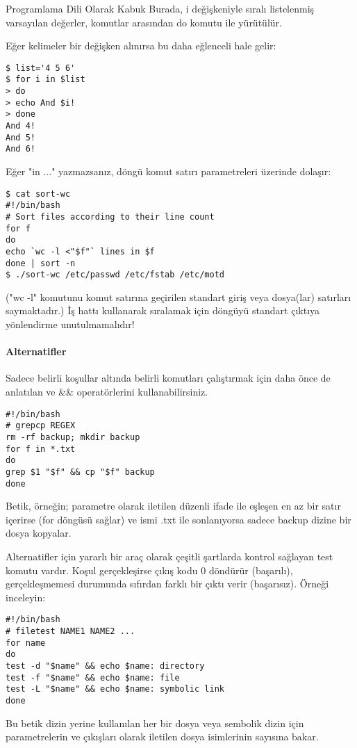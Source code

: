 \begin{section}{Programlama Dili Olarak Kabuk}
Burada, i değişkeniyle sıralı listelenmiş varsayılan değerler, komutlar arasından do komutu ile yürütülür.

Eğer kelimeler bir değişken alınırsa bu daha eğlenceli hale gelir:
\begin{verbatim}
$ list='4 5 6'
$ for i in $list
> do
> echo And $i!
> done
And 4!
And 5!
And 6!
\end{verbatim}

Eğer "in ..." yazmazsanız, döngü komut satırı parametreleri üzerinde dolaşır:
\begin{verbatim}
$ cat sort-wc
#!/bin/bash
# Sort files according to their line count
for f
do
echo `wc -l <"$f"` lines in $f
done | sort -n
$ ./sort-wc /etc/passwd /etc/fstab /etc/motd
\end{verbatim}

("wc -l" komutunu komut satırına geçirilen standart giriş veya dosya(lar) satırları saymaktadır.) İş hattı kullanarak sıralamak için döngüyü standart çıktıya yönlendirme unutulmamalıdır!

\paragraph{Alternatifler}{ Sadece belirli koşullar altında belirli komutları çalıştırmak için daha önce de anlatılan \textbar \textbar ve \&\& operatörlerini kullanabilirsiniz.
\begin{verbatim}
#!/bin/bash
# grepcp REGEX
rm -rf backup; mkdir backup
for f in *.txt
do
grep $1 "$f" && cp "$f" backup
done
\end{verbatim}
}

Betik, örneğin; parametre olarak iletilen düzenli ifade ile eşleşen en az bir satır içerirse (for döngüsü sağlar) ve ismi .txt ile sonlanıyorsa sadece backup
dizine bir dosya kopyalar.

Alternatifler için yararlı bir araç olarak çeşitli şartlarda kontrol sağlayan test komutu vardır. Koşul gerçekleşirse çıkış kodu 0 döndürür (başarılı),
gerçekleşmemesi durumunda sıfırdan farklı bir çıktı verir (başarısız). Örneği inceleyin:
\begin{verbatim}
#!/bin/bash
# filetest NAME1 NAME2 ...
for name
do
test -d "$name" && echo $name: directory
test -f "$name" && echo $name: file
test -L "$name" && echo $name: symbolic link
done
\end{verbatim}

Bu betik dizin yerine kullanılan her bir dosya veya sembolik dizin için parametrelerin ve çıkışları olarak iletilen dosya isimlerinin sayısına bakar.


\end{section}

